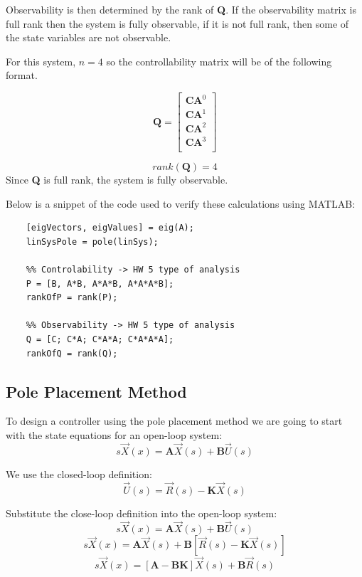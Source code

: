 \documentclass[titlepage]{article}
\begin{document}
	Observability is then determined by the rank of \textbf{Q}. If the observability matrix is full rank then the system is fully observable, if it is not full rank, then some of the state variables are not observable.

	For this system, \(n=4\) so the controllability matrix will be of the following format.

	\[\textbf{Q} = \begin{bmatrix}
		\textbf{C}\textbf{A}^{0}\\
		\textbf{C}\textbf{A}^{1}\\
		\textbf{C}\textbf{A}^{2}\\
		\textbf{C}\textbf{A}^{3}\\
		\end{bmatrix}\]

	\[rank\left(\textbf{Q}\right) = 4\]
	Since \textbf{Q} is full rank, the system is fully observable.

	Below is a snippet of the code used to verify these calculations using MATLAB:
	\begin{lstlisting}[style=Matlab-editor]
	%% Stability -> HW 4 type of analysis
	[eigVectors, eigValues] = eig(A);
	linSysPole = pole(linSys);

	%% Controlability -> HW 5 type of analysis
	P = [B, A*B, A*A*B, A*A*A*B];
	rankOfP = rank(P);

	%% Observability -> HW 5 type of analysis
	Q = [C; C*A; C*A*A; C*A*A*A];
	rankOfQ = rank(Q);
	\end{lstlisting}

\subsection{Pole Placement Method}
	To design a controller using the pole placement method we are going to start with the state equations for an open-loop system:
	\[s\vec{X}\left(x\right) = \textbf{A}\vec{X}\left(s\right) + \textbf{B}\vec{U}\left(s\right)\]

	We use the closed-loop definition:
	\[\vec{U}\left(s\right) = \vec{R}\left(s\right) - \textbf{K}\vec{X}\left(s\right)\]

	Substitute the close-loop definition into the open-loop system:
	\[s\vec{X}\left(x\right) = \textbf{A}\vec{X}\left(s\right) + \textbf{B}\vec{U}\left(s\right)\]
	\[s\vec{X}\left(x\right) = \textbf{A}\vec{X}\left(s\right) + \textbf{B}\left[\vec{R}\left(s\right) - \textbf{K}\vec{X}\left(s\right)\right]\]
	\[s\vec{X}\left(x\right) = \left[\textbf{A} - \textbf{B}\textbf{K}\right]\vec{X}\left(s\right) + \textbf{B}\vec{R}\left(s\right)\]
\end{document}
